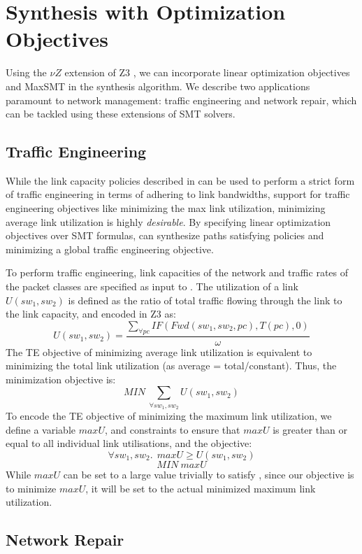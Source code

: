 \section{Synthesis with Optimization Objectives}
Using the $\nu Z$ extension of Z3 \cite{nuz3}, we can incorporate 
linear optimization
objectives and MaxSMT in the synthesis algorithm. 
We describe two applications paramount to network management:
traffic engineering and network repair, which can be tackled using
these extensions of SMT solvers.
\subsection{Traffic Engineering}
While the link capacity policies described in  can
be used to perform a strict form of traffic engineering in terms of 
adhering to link bandwidths, support for traffic engineering objectives
like minimizing the max link utilization, minimizing average link utilization
is highly \emph{desirable}. By specifying linear optimization objectives over
SMT formulas, \name can synthesize paths satisfying policies and minimizing
a global traffic engineering objective. 

To perform traffic engineering, link capacities of the network and traffic 
rates of the packet classes are specified as input to \name. The utilization 
of a link $U(sw_1, sw_2)$ is defined as the ratio of total traffic flowing through the link to the 
link capacity, and encoded in Z3 as:
\begin{equation}
U(sw_1, sw_2) = \frac{\sum_{\forall pc} IF(Fwd(sw_1,sw_2, pc), T(pc), 0)} {\omega}
\end{equation}
The TE objective of minimizing average link utilization is equivalent to minimizing
the total link utilization (as average = total/constant). Thus, the minimization
objective is:
\begin{equation}
	MIN\ \sum_{\forall sw_1, sw_2} U(sw_1, sw_2)
\end{equation}
To encode the TE objective of minimizing the maximum link utilization, we define
a variable $maxU$, and constraints to ensure that $maxU$ is greater than or equal to all 
individual link utilisations, and the objective: 
\begin{equation} \label{eq:maxu}
\forall sw_1, sw_2.\ \ maxU \geq U(sw_1, sw_2)
\end{equation} 
\begin{equation}
	MIN\ maxU
\end{equation}
While $maxU$ can be set to a large value trivially to satisfy 
, since our objective is to minimize $maxU$, it will be set to the actual
minimized maximum link utilization. 


\subsection{Network Repair}